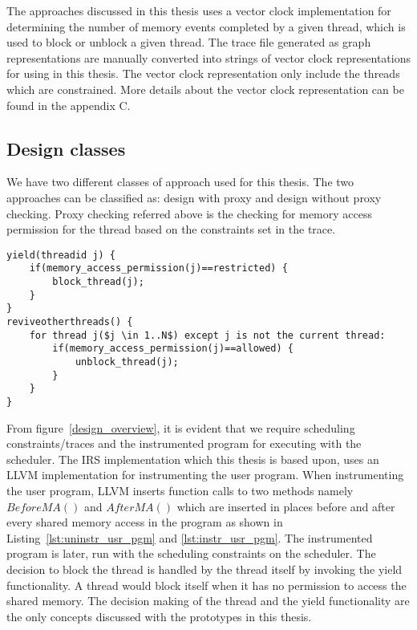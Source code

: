 The approaches discussed in this thesis uses a vector clock implementation for determining the number of memory events completed by a given thread, which is used to block or unblock a given thread. 
The trace file generated as graph representations are manually converted into strings of vector clock representations for using in this thesis. 
The vector clock representation only include the threads which are constrained. 
More details about the vector clock representation can be found in the appendix C.


\subsection{Design classes}

We have two different classes of approach used for this thesis. 
The two approaches can be classified as: design with proxy and design without proxy checking. 
Proxy checking referred above is the checking for memory  access permission for the thread based on the constraints set in the trace. 

\begin{lstlisting}[mathescape=true,style=customc,caption={Yield functionality and thread revival},frame=tlrb,label={lst:yield_func}]
yield(threadid j) {
	if(memory_access_permission(j)==restricted) {
		block_thread(j);
	}
}
reviveotherthreads() {
	for thread j($j \in 1..N$) except j is not the current thread:
		if(memory_access_permission(j)==allowed) {
			unblock_thread(j);
		}	
	}
}
\end{lstlisting}
From figure~\ref{design_overview}, it is evident that we require scheduling constraints/traces and the instrumented program for executing with the scheduler. 
The IRS implementation which this thesis is based upon, uses an LLVM implementation for instrumenting the user program. 
When instrumenting the user program, LLVM inserts function calls to two methods namely $BeforeMA()$ and $AfterMA()$ which are inserted in places before and after every shared memory access in the program as shown in Listing~\ref{lst:uninstr_usr_pgm} and \ref{lst:instr_usr_pgm}. 
The instrumented program is later, run with the scheduling constraints on the scheduler. 
The decision to block the thread is handled by the thread itself by invoking the yield functionality. 
A thread would block itself when it has no permission to access the shared memory. 
The decision making of the thread and the yield functionality are the only concepts discussed with the prototypes in this thesis. 

